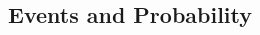 \documentclass{article}
\begin{document}
\begin{multicols}{3}
    \section{Events and Probability}

\end{multicols}
\end{document}
